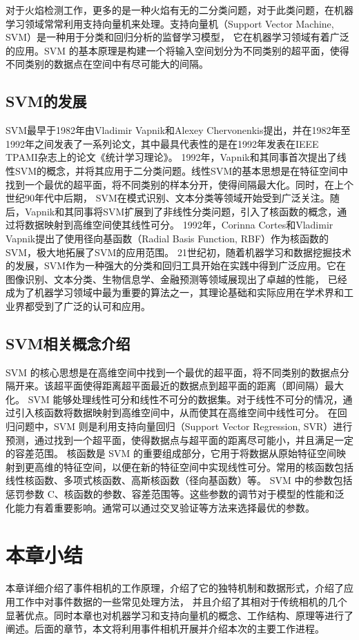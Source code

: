 对于火焰检测工作，更多的是一种火焰有无的二分类问题，对于此类问题，在机器学习领域常常利用支持向量机来处理。支持向量机（Support Vector Machine, SVM）是一种用于分类和回归分析的监督学习模型，
它在机器学习领域有着广泛的应用。SVM 的基本原理是构建一个将输入空间划分为不同类别的超平面，使得不同类别的数据点在空间中有尽可能大的间隔。
\subsection{SVM的发展}
SVM最早于1982年由Vladimir Vapnik和Alexey Chervonenkis提出\cite{stitson1996theory}，并在1982年至1992年之间发表了一系列论文，其中最具代表性的是在1992年发表在IEEE TPAMI杂志上的论文《统计学习理论》。
1992年，Vapnik和其同事首次提出了线性SVM的概念，并将其应用于二分类问题\cite{chapelle1999support}。线性SVM的基本思想是在特征空间中找到一个最优的超平面，将不同类别的样本分开，使得间隔最大化。同时，在上个世纪90年代中后期，
SVM在模式识别、文本分类等领域开始受到广泛关注。随后，Vapnik和其同事将SVM扩展到了非线性分类问题，引入了核函数的概念，\cite{cortes1995support}通过将数据映射到高维空间使其线性可分。
1992年，Corinna Cortes和Vladimir Vapnik提出了使用径向基函数（Radial Basis Function, RBF）作为核函数的SVM，极大地拓展了SVM的应用范围。
21世纪初，随着机器学习和数据挖掘技术的发展，SVM作为一种强大的分类和回归工具开始在实践中得到广泛应用。它在图像识别、文本分类、生物信息学、金融预测等领域展现出了卓越的性能，
已经成为了机器学习领域中最为重要的算法之一，其理论基础和实际应用在学术界和工业界都受到了广泛的认可和应用。
\subsection{SVM相关概念介绍}
SVM 的核心思想是在高维空间中找到一个最优的超平面，将不同类别的数据点分隔开来。该超平面使得距离超平面最近的数据点到超平面的距离（即间隔）最大化。
SVM 能够处理线性可分和线性不可分的数据集。对于线性不可分的情况，通过引入核函数将数据映射到高维空间中，从而使其在高维空间中线性可分。
在回归问题中，SVM 则是利用支持向量回归（Support Vector Regression, SVR）进行预测，通过找到一个超平面，使得数据点与超平面的距离尽可能小，并且满足一定的容差范围。
核函数是 SVM 的重要组成部分，它用于将数据从原始特征空间映射到更高维的特征空间，以便在新的特征空间中实现线性可分。常用的核函数包括线性核函数、多项式核函数、高斯核函数（径向基函数）等。
SVM 中的参数包括惩罚参数 C、核函数的参数、容差范围等。这些参数的调节对于模型的性能和泛化能力有着重要影响。通常可以通过交叉验证等方法来选择最优的参数。






\section{本章小结}
本章详细介绍了事件相机的工作原理，介绍了它的独特机制和数据形式，介绍了应用工作中对事件数据的一些常见处理方法，
并且介绍了其相对于传统相机的几个显著优点。同时本章也对机器学习和支持向量机的概念、工作结构、原理等进行了阐述。后面的章节，本文将利用事件相机开展并介绍本次的主要工作进程。